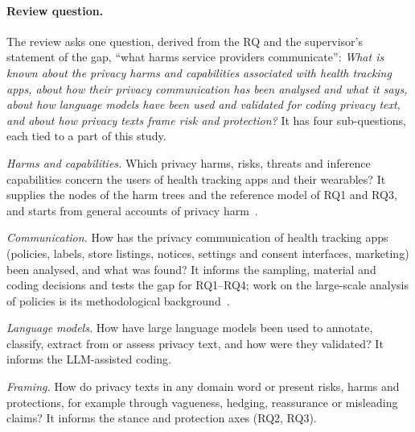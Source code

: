 \paragraph{Review question.} The review asks one question, derived from the RQ
and the supervisor's statement of the gap, \enquote{what harms service providers
communicate}: \emph{What is known about the privacy harms and capabilities
associated with health tracking apps, about how their privacy communication has
been analysed and what it says, about how language models have been used and
validated for coding privacy text, and about how privacy texts frame risk and
protection?} It has four sub-questions, each tied to a part of this study.
\begin{description}[leftmargin=1.5em,itemsep=1pt,topsep=3pt,labelindent=0pt,font=\normalfont\bfseries]
  \item[LQ1] \textit{Harms and capabilities.} Which privacy harms, risks, threats
    and inference capabilities concern the users of health tracking apps and
    their wearables? It supplies the nodes of the harm trees and the reference
    model of RQ1 and RQ3, and starts from general accounts of privacy
    harm~\parencite{solove2006taxonomy,calo2011boundaries,citron2021harms}.
  \item[LQ2] \textit{Communication.} How has the privacy communication of health
    tracking apps (policies, labels, store listings, notices, settings and
    consent interfaces, marketing) been analysed, and what was found? It informs
    the sampling, material and coding decisions and tests the gap for RQ1--RQ4;
    work on the large-scale analysis of policies is its methodological
    background~\parencite{wilson2016creation,zimmeck2019maps}.
  \item[LQ3] \textit{Language models.} How have large language models been used
    to annotate, classify, extract from or assess privacy text, and how were
    they validated? It informs the LLM-assisted coding.
  \item[LQ4] \textit{Framing.} How do privacy texts in any domain word or present
    risks, harms and protections, for example through vagueness, hedging,
    reassurance or misleading claims? It informs the stance and protection axes
    (RQ2, RQ3).
\end{description}

